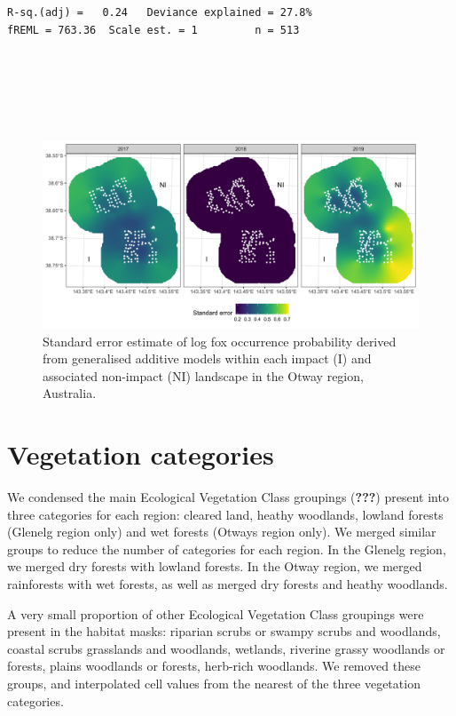 \documentclass[11pt,a4paper,titlepage,twoside,openright]{style/unimelbthesis}
\begin{document}
\begin{mainmatter}
\begin{verbatim}
R-sq.(adj) =   0.24   Deviance explained = 27.8%
fREML = 763.36  Scale est. = 1         n = 513
\end{verbatim}
\newpage

\(~\)

\(~\)

\(~\)
\begin{figure}

{\centering \includegraphics[width=1\linewidth]{figure/fox_occ_se_otways_600dpi} 

}

\caption{Standard error estimate of log fox occurrence probability derived from generalised additive models within each impact (I) and associated non-impact (NI) landscape in the Otway region, Australia.}\label{fig:density-fox-se-o}
\end{figure}
\newpage

\hypertarget{density-app-veg}{%
\section{Vegetation categories}\label{density-app-veg}}

We condensed the main Ecological Vegetation Class groupings ({\textbf{???}}) present into three categories for each region: cleared land, heathy woodlands, lowland forests (Glenelg region only) and wet forests (Otways region only). We merged similar groups to reduce the number of categories for each region. In the Glenelg region, we merged dry forests with lowland forests. In the Otway region, we merged rainforests with wet forests, as well as merged dry forests and heathy woodlands.

A very small proportion of other Ecological Vegetation Class groupings were present in the habitat masks: riparian scrubs or swampy scrubs and woodlands, coastal scrubs grasslands and woodlands, wetlands, riverine grassy woodlands or forests, plains woodlands or forests, herb-rich woodlands. We removed these groups, and interpolated cell values from the nearest of the three vegetation categories.


\end{mainmatter}
\end{document}
